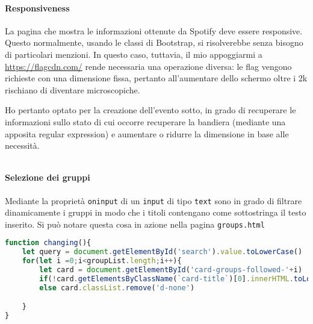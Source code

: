 \paragraph{Responsiveness} La pagina che mostra le informazioni ottenute da Spotify deve essere responsive. Questo normalmente, usando le classi di Bootstrap, si risolverebbe senza bisogno di particolari menzioni. In questo caso, tuttavia, il mio appoggiarmi a \href{https://flagcdn.com/}{https://flagcdn.com/} rende necessaria una operazione diversa: le flag vengono richieste con una dimensione fissa, pertanto all'aumentare dello schermo oltre i 2k rischiano di diventare microscopiche.

Ho pertanto optato per la creazione dell'evento sotto, in grado di recuperare le informazioni sullo stato di cui occorre recuperare la bandiera (mediante una apposita regular expression) e aumentare o ridurre la dimensione in base alle necessità.
\begin{lstlisting}[language=JavaScript]

\end{lstlisting}
\paragraph{Selezione dei gruppi} Mediante la proprietà \verb|oninput| di un \verb|input| di tipo \verb|text| sono in grado di filtrare dinamicamente i gruppi in modo che i titoli contengano come sottostringa il testo inserito. Si può notare questa cosa in azione nella pagina \verb|groups.html|
\begin{lstlisting}[language=JavaScript]
function changing(){
    let query = document.getElementById('search').value.toLowerCase()
    for(let i =0;i<groupList.length;i++){
        let card = document.getElementById('card-groups-followed-'+i)
        if(!card.getElementsByClassName(`card-title`)[0].innerHTML.toLowerCase().includes(query)) card.classList.add('d-none')
        else card.classList.remove('d-none')

    }
}
\end{lstlisting}
